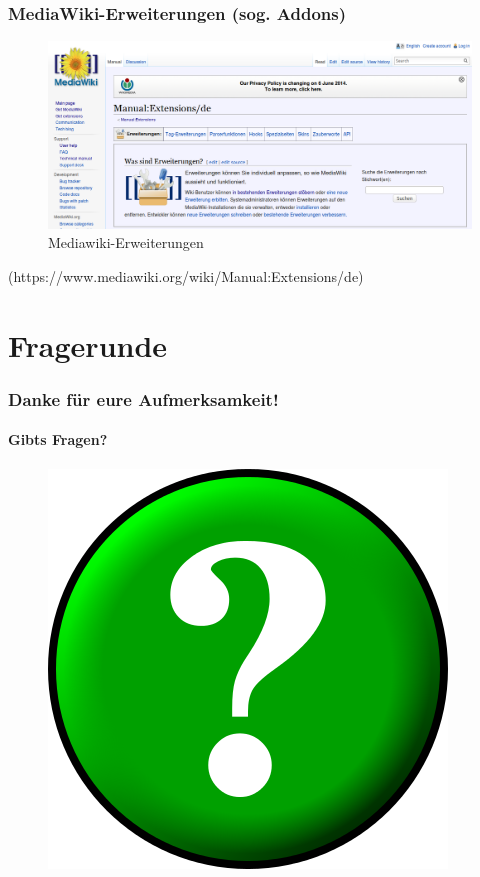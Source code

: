 \documentclass{beamer}              %
\begin{document}
\begin{frame}
  \frametitle{MediaWiki-Erweiterungen (sog. Addons)}

	\begin{figure}[tbph]
		\centering
		\includegraphics[width=\linewidth]{Mediawiki-Extensions}
		\caption[Mediawiki-Erweiterungen]{Mediawiki-Erweiterungen}
		\label{fig:Mediawiki-Extensions}
	\end{figure}

  (https://www.mediawiki.org/wiki/Manual:Extensions/de)

\end{frame}

\section{Fragerunde}

\begin{frame}
  \frametitle{Danke für eure Aufmerksamkeit!}
  \framesubtitle{Gibts Fragen?}

  \begin{figure}
      \includegraphics[scale=0.5]{Circle-question_400x400.png}
      \label{fig:Fragezeichenschild}
  \end{figure}

\end{frame}
\end{document}

